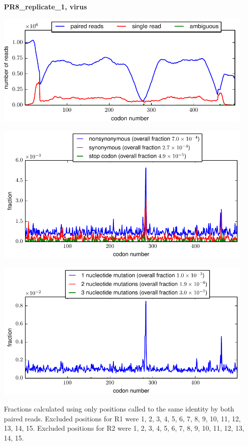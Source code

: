 \documentclass[10pt,letterpaper]{article}
\begin{document}
\centerline{\Large \bf PR8\_replicate\_1, virus}
\vspace{0.1in}

\centerline{\includegraphics[width=5in]{PR8_replicate_1_virus_codondepth.pdf}}
\vspace{0.1in}

\centerline{\includegraphics[width=5in]{PR8_replicate_1_virus_syn-ns-dist.pdf}}
\vspace{0.1in}

\centerline{\includegraphics[width=5in]{PR8_replicate_1_virus_nmutspercodon-dist.pdf}}
\vspace{0.1in}

Fractions calculated using only positions called to the same identity by both paired reads.  Excluded positions for R1 were 1, 2, 3, 4, 5, 6, 7, 8, 9, 10, 11, 12, 13, 14, 15. 
 Excluded positions for R2 were 1, 2, 3, 4, 5, 6, 7, 8, 9, 10, 11, 12, 13, 14, 15. 
\end{document}
